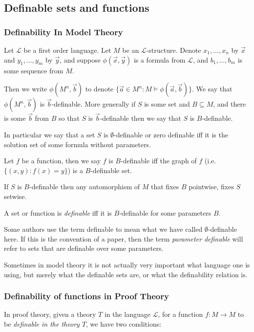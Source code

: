 \documentclass[12pt]{article}
\begin{document}
\subsection{Definable sets and functions}

\subsubsection{Definability In Model Theory}
Let $\mathcal{L}$ be a first order language. Let $M$ be an $\mathcal{L}$-structure. Denote $x_1, \ldots, x_n$ by $\vec{x}$ and $y_1, \ldots, y_m$ by $\vec{y}$, and suppose $\phi(\vec{x},\vec{y})$ is a formula from $\mathcal{L}$,  and $b_1, \ldots, b_m$ is some sequence from $M$.

Then we write $\phi(M^{n},\vec{b})$ to denote $\{\vec{a} \in M^{n}:M \models \phi(\vec{a},\vec{b})\}$. 
We say that $\phi(M^{n},\vec{b})$ is $\vec{b}$-definable. 
More generally if $S$ is some set and $B \subseteq M$, and there is some $\vec{b}$ from $B$ so that $S$ is $\vec{b}$-definable then we say that $S$ is $B$-definable.

In particular we say that a set $S$ is $\emptyset$-definable or zero definable iff it is the solution set of some formula without parameters.

Let $f$ be a function, then we say $f$ is $B$-definable iff the graph of $f$ (i.e. $\{(x,y):f(x)=y\}$) is a $B$-definable set.

If $S$ is $B$-definable then any automorphism of $M$ that fixes $B$ pointwise, fixes $S$ setwise.

A set or function is {\em definable} iff it is $B$-definable for some parameters $B$.

Some authors use the term definable to mean what we have called $\emptyset$-definable here. 
If this is the convention of a paper, then the term \emph{parameter definable} will refer to sets that are definable over some parameters.

Sometimes in model theory it is not actually very important what language one is using, but merely what the definable sets are, or what the definability relation is.

\subsubsection{Definability of functions in Proof Theory}
In proof theory, given a theory $T$ in the language $\mathcal{L}$, for a function $f:M\rightarrow M$ to be \emph{definable in the theory $T$}, we have two conditions:
\end{document}
